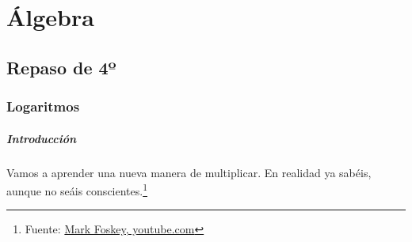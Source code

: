 
\chapter{Álgebra}

\section{Repaso de 4º}

\subsection{Logaritmos}

\paragraph{Introducción}

Vamos a aprender una nueva manera de multiplicar. En realidad ya sabéis, aunque no seáis conscientes.\footnote{Fuente: \href{https://www.youtube.com/watch?v=FB3\_BeukBBk\&t=99s}{Mark Foskey, youtube.com}}


